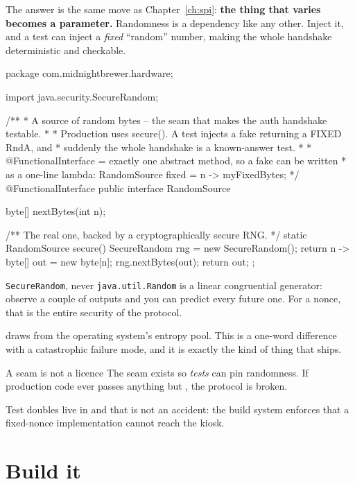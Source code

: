 The answer is the same move as Chapter~\ref{ch:spi}: \textbf{the thing that
varies becomes a parameter.} Randomness is a dependency like any other. Inject
it, and a test can inject a \emph{fixed} ``random'' number, making the whole
handshake deterministic and checkable.

\begin{jcode}
package com.midnightbrewer.hardware;

import java.security.SecureRandom;

/**
 * A source of random bytes -- the seam that makes the auth handshake testable.
 *
 * Production uses secure(). A test injects a fake returning a FIXED RndA, and
 * suddenly the whole handshake is a known-answer test.
 *
 * @FunctionalInterface = exactly one abstract method, so a fake can be written
 * as a one-line lambda:   RandomSource fixed = n -> myFixedBytes;
 */
@FunctionalInterface
public interface RandomSource {

    byte[] nextBytes(int n);

    /** The real one, backed by a cryptographically secure RNG. */
    static RandomSource secure() {
        SecureRandom rng = new SecureRandom();
        return n -> {
            byte[] out = new byte[n];
            rng.nextBytes(out);
            return out;
        };
    }
}
\end{jcode}

\begin{trap}{\texttt{SecureRandom}, never \texttt{java.util.Random}}
 is a linear congruential generator: observe a couple of outputs and
you can predict every future one. For a nonce, that is the entire security of the
protocol.

 draws from the operating system's entropy pool. This is a
one-word difference with a catastrophic failure mode, and it is exactly the kind
of thing that ships.
\end{trap}

\begin{concept}{A seam is not a licence}
The  seam exists so \emph{tests} can pin randomness. If
production code ever passes anything but , the
protocol is broken.

Test doubles live in  and that is not an accident: the build
system enforces that a fixed-nonce implementation cannot reach the kiosk.
\end{concept}

\section{Build it}

